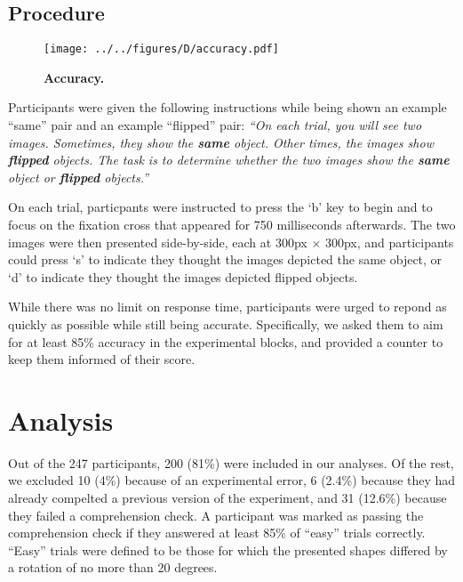 \documentclass[10pt,letterpaper]{article}
\begin{document}
\subsection{Procedure}

\begin{figure*}[t]
  \begin{center}
    \texttt{[image: ../../figures/D/accuracy.pdf]}
    \caption{\textbf{Accuracy.}}
    \label{fig:response-times}
  \end{center}
\end{figure*}

Participants were given the following instructions while being shown
an example ``same'' pair and an example ``flipped'' pair: \textit{``On
  each trial, you will see two images. Sometimes, they show the
  \textbf{same} object. Other times, the images show \textbf{flipped}
  objects. The task is to determine whether the two images show the
  \textbf{same} object or \textbf{flipped} objects.''}

On each trial, particpants were instructed to press the `b' key to
begin and to focus on the fixation cross that appeared for 750
milliseconds afterwards. The two images were then presented
side-by-side, each at 300px $\times$ 300px, and participants could
press `s' to indicate they thought the images depicted the same
object, or `d' to indicate they thought the images depicted flipped
objects.

While there was no limit on response time, participants were urged to
repond as quickly as possible while still being
accurate. Specifically, we asked them to aim for at least 85\%
accuracy in the experimental blocks, and provided a counter to keep
them informed of their score.

\section{Analysis}

Out of the 247 participants, 200 (81\%) were included in our
analyses. Of the rest, we excluded 10 (4\%) because of an experimental
error, 6 (2.4\%) because they had already compelted a previous version
of the experiment, and 31 (12.6\%) because they failed a comprehension
check. A participant was marked as passing the comprehension check if
they answered at least 85\% of ``easy'' trials correctly. ``Easy''
trials were defined to be those for which the presented shapes
differed by a rotation of no more than 20 degrees.
\end{document}
